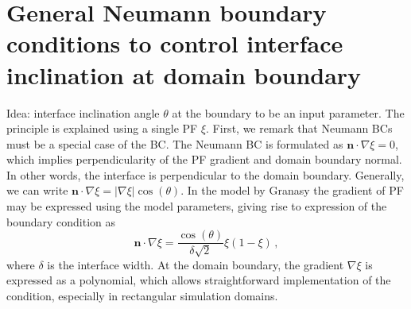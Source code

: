 \section{General Neumann boundary conditions to control interface inclination at domain boundary}

Idea: interface inclination angle $\theta$ at the boundary to be an input parameter. The principle is explained using a single PF $\xi$. 
First, we remark that Neumann BCs must be a special case of the BC. The Neumann BC is formulated as $\bm{n}\cdot \nabla\xi=0$, which implies perpendicularity of the PF gradient and domain boundary normal. In other words, the interface is perpendicular to the domain boundary. Generally, we can write $\bm{n}\cdot \nabla\xi=|\nabla\xi|\cos(\theta)$. In the model by Granasy the gradient of PF may be expressed using the model parameters, giving rise to expression of the boundary condition as
\begin{equation}
	\bm{n}\cdot \nabla\xi=\frac{\cos(\theta)}{\delta\sqrt{2}}\xi(1-\xi)\,,
\end{equation}
where $\delta$ is the interface width. At the domain boundary, the gradient $\nabla\xi$ is expressed as a polynomial, which allows straightforward implementation of the condition, especially in rectangular simulation domains.\\

